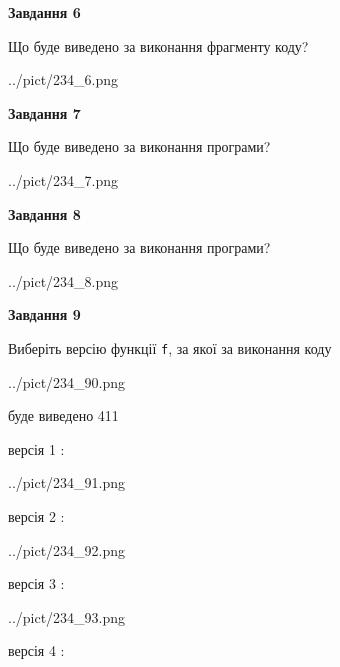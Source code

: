 \documentclass[12pt, ukrainian]{article}
\def\code#1{\Verb!#1!}
\begin{document}
{\begin {large}
{\begin {center}\textbf{Завдання 6}\end {center}}

Що буде виведено за виконання фрагменту коду?\par
\begin{center}
	{../pict/234_6.png}
\end{center}
\newpage

{\begin {center}\textbf{Завдання 7}\end {center}}

Що буде виведено за виконання програми?\par
\begin{center}
	{../pict/234_7.png}
\end{center}
\newpage

{\begin {center}\textbf{Завдання 8}\end {center}}

Що буде виведено за виконання програми?\par
\begin{center}
	{../pict/234_8.png}
\end{center}
\newpage

{\begin {center}\textbf{Завдання 9}\end {center}}

Виберіть версію функції \code{f}, за якої за виконання коду
\begin{center}
	{../pict/234_90.png}
\end{center}
буде виведено 411

\vspace{5mm}
версія 1 :

\begin{center}
	{../pict/234_91.png}
\end{center}
версія 2 :

\begin{center}
	{../pict/234_92.png}
\end{center}
версія 3 :

\begin{center}
	{../pict/234_93.png}
\end{center}
версія 4 :


\end{large}}
\end{document}
